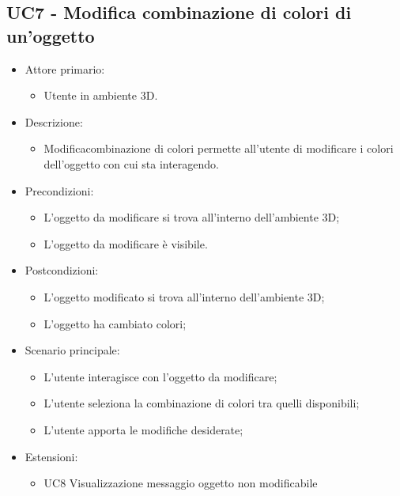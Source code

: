 \subsection{UC7 - Modifica combinazione di colori di un'oggetto}
\begin{itemize}

	\item Attore primario: 
	\begin{itemize}
		\item Utente in ambiente 3D.
	\end{itemize}
	\item Descrizione:
	\begin{itemize}
		\item Modificacombinazione di colori permette all'utente di modificare i colori dell'oggetto con cui sta interagendo.
	\end{itemize}
	
	\item Precondizioni:
	\begin{itemize}
		\item L'oggetto da modificare si trova all'interno dell'ambiente 3D;
		\item L'oggetto da modificare è visibile.
	\end{itemize}
	
	\item Postcondizioni:
	\begin{itemize}
		\item L'oggetto modificato si trova all'interno dell'ambiente 3D;
		\item L'oggetto ha cambiato colori;
	\end{itemize}
	
	\item Scenario principale:
	\begin{itemize}
		\item L'utente interagisce con l'oggetto da modificare;
		\item L'utente seleziona la combinazione di colori tra quelli disponibili;
		\item L'utente apporta le modifiche desiderate;
	\end{itemize}
	\item Estensioni:
	\begin{itemize}
		\item UC8 Visualizzazione messaggio oggetto non modificabile
	\end{itemize}
	
\end{itemize}



